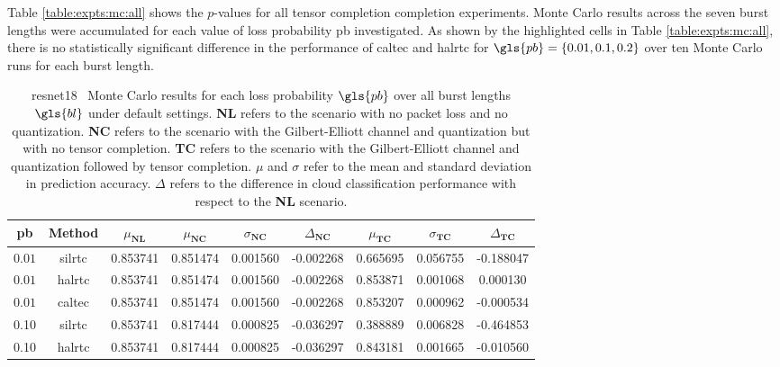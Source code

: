 Table \ref{table:expts:mc:all} shows the $p$-values for all tensor completion completion experiments. Monte Carlo results across the seven burst lengths were accumulated for each value of loss probability \gls{pb} investigated. As shown by the highlighted cells in Table \ref{table:expts:mc:all}, there is no statistically significant difference in the performance of \gls{caltec} and \gls{halrtc} for $\gls{pb}=\{0.01,0.1,0.2\}$ over ten Monte Carlo runs for each burst length. 


\begin{table}[H]
	\caption[Summarized ResNet18 Monte Carlo results with tensor completion]{\gls{resnet18} \addthree~Monte Carlo results for each loss probability $\gls{pb}$ over all burst lengths $\gls{bl}$ under default settings. \textbf{NL} refers to the scenario with no packet loss and no quantization. \textbf{NC} refers to the scenario with the Gilbert-Elliott channel and quantization but with no tensor completion. \textbf{TC} refers to the scenario with the Gilbert-Elliott channel and quantization followed by tensor completion. $\mu$ and $\sigma$ refer to the mean and standard deviation in prediction accuracy. $\Delta$ refers to the difference in cloud classification performance with respect to the \textbf{NL} scenario.}\label{table:expts:mc:long:add3}
	\centering 
	\begin{adjustbox}{max width=\textwidth}
		\begin{tabular}{|c|c|c|ccc|ccc|}
			\hline 
			\gls{pb} & \textbf{Method} &   $\mu_{\textbf{NL}}$ &   $\mu_{\textbf{NC}}$ &  $\sigma_{\textbf{NC}}$ &  $\Delta_{\textbf{NC}}$ & $\mu_{\textbf{TC}}$ & $\sigma_{\textbf{TC}}$ & $\Delta_{\textbf{TC}}$ \\
			\hline \hline
			$0.01$ & \gls{silrtc} & 0.853741 &  0.851474 &  0.001560 & -0.002268 & 0.665695 &    0.056755 &   -0.188047 \\
			$0.01$ & \cellcolor{green!25}\gls{halrtc} & 0.853741 &  0.851474 &  0.001560 & -0.002268 & \cellcolor{green!25}0.853871 &    0.001068 &  \cellcolor{green!25}  0.000130 \\
			$0.01$ & \gls{caltec} & 0.853741 &  0.851474 &  0.001560 &  -0.002268 & 0.853207 &    0.000962 &   -0.000534 \\
			\hline 
			0.10 & \gls{silrtc} &  0.853741 &  0.817444 &  0.000825 & -0.036297 & 0.388889 & 0.006828 & -0.464853 \\
			0.10 & \cellcolor{green!25}\gls{halrtc} & 0.853741 &  0.817444 &  0.000825 & -0.036297 & \cellcolor{green!25} 0.843181 &    0.001665 & \cellcolor{green!25}  -0.010560 \\

\end{tabular}
\end{adjustbox}
\end{table}
